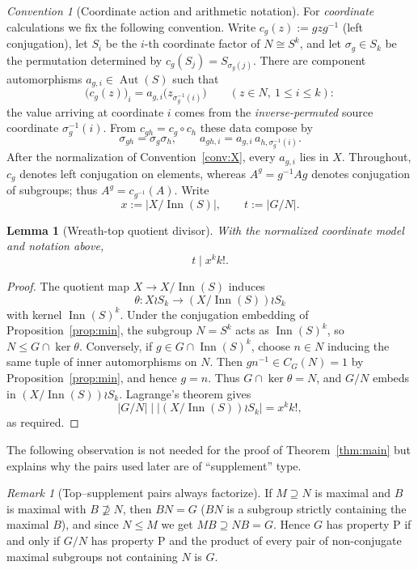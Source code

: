 \documentclass[11pt]{amsart}
\newtheorem{lemma}[theorem]{Lemma}
\theoremstyle{definition}
\theoremstyle{remark}
\newtheorem{remark}[theorem]{Remark}
\newtheorem{convention}[theorem]{Convention}
\DeclareMathOperator{\Inn}{Inn}
\DeclareMathOperator{\Aut}{Aut}
\begin{document}
\begin{convention}[Coordinate action and arithmetic
notation]\label{conv:coord}
For \emph{coordinate} calculations we fix the following convention.
Write $c_g(z):=gzg^{-1}$ (left conjugation), let $S_i$ be the $i$-th
coordinate factor of $N\cong S^k$, and let $\sigma_g\in S_k$ be the
permutation determined by $c_g(S_j)=S_{\sigma_g(j)}$. There are
component automorphisms $a_{g,i}\in\Aut(S)$ such that
\[
\bigl(c_g(z)\bigr)_i=a_{g,i}\bigl(z_{\sigma_g^{-1}(i)}\bigr)
\qquad(z\in N,\ 1\leq i\leq k):
\]
the value arriving at coordinate $i$ comes from the
\emph{inverse-permuted} source coordinate $\sigma_g^{-1}(i)$. From
$c_{gh}=c_g\circ c_h$ these data compose by
\[
\sigma_{gh}=\sigma_g\sigma_h,\qquad
a_{gh,i}=a_{g,i}\,a_{h,\sigma_g^{-1}(i)} .
\]
After the normalization of Convention~\ref{conv:X}, every $a_{g,i}$
lies in $X$. Throughout, $c_g$ denotes left conjugation on elements, whereas
$A^g=g^{-1}Ag$ denotes conjugation of subgroups; thus
$A^g=c_{g^{-1}}(A)$. Write
\[
x:=|X/\Inn(S)|,\qquad t:=|G/N| .
\]
\end{convention}

\begin{lemma}[Wreath-top quotient divisor]\label{lem:wreath-divisor}
With the normalized coordinate model and notation above,
\[
 t\mid x^k k!.
\]
\end{lemma}

\begin{proof}
The quotient map $X\to X/\Inn(S)$ induces
\[
 \theta\colon X\wr S_k\longrightarrow (X/\Inn(S))\wr S_k
\]
with kernel $\Inn(S)^k$. Under the conjugation embedding of
Proposition~\ref{prop:min}, the subgroup $N=S^k$ acts as
$\Inn(S)^k$, so $N\leq G\cap\ker\theta$. Conversely, if
$g\in G\cap\Inn(S)^k$, choose $n\in N$ inducing the same tuple of inner
automorphisms on $N$. Then $gn^{-1}\in C_G(N)=1$ by
Proposition~\ref{prop:min}, and hence $g=n$. Thus
$G\cap\ker\theta=N$, and $G/N$ embeds in
$(X/\Inn(S))\wr S_k$. Lagrange's theorem gives
\[
 |G/N|\mid |(X/\Inn(S))\wr S_k|=x^k k!,
\]
as required.
\end{proof}

The following observation is not needed for the proof of
Theorem~\ref{thm:main} but explains why the pairs used later are of
``supplement'' type.

\begin{remark}[Top--supplement pairs always factorize]
If $M\supseteq N$ is maximal and $B$ is maximal with $B\not\supseteq N$,
then $BN=G$ ($BN$ is a subgroup strictly containing the maximal $B$),
and since $N\leq M$ we get $MB\supseteq NB=G$. Hence $G$ has property
$\mathrm{P}$ if and only if $G/N$ has property $\mathrm{P}$ and the product
of every pair of non-conjugate maximal subgroups not containing $N$ is $G$.
\end{remark}
\end{document}
